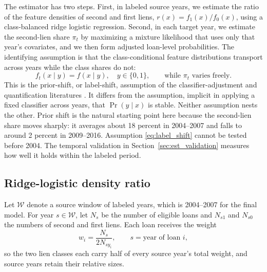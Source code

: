 \documentclass[letterpaper,12pt,usenames,dvipsnames]{article}
\theoremstyle{definition}
\begin{document}
The estimator has two steps. First, in labeled source years, we estimate the ratio of the
feature densities of second and first liens, $r(x) = f_1(x)/f_0(x)$, using a class-balanced
ridge logistic regression. Second, in each target year, we estimate the second-lien share
$\pi_t$ by maximizing a mixture likelihood that uses only that year's covariates, and we then
form adjusted loan-level probabilities. The identifying assumption is that the class-conditional
feature distributions transport across years while the class shares do not:
\begin{equation}
	f_t(x \mid y) = f(x \mid y), \quad y \in \{0, 1\},
	\qquad \text{while } \pi_t \text{ varies freely.}
	\label{eq:label_shift}
\end{equation}
This is the prior-shift, or label-shift, assumption of the classifier-adjustment and
quantification literatures \citep{saerens2002adjusting,gonzalez2017review,lipton2018detecting}.
It differs from the assumption, implicit in applying a fixed classifier across years, that
$\Pr(y \mid x)$ is stable. Neither assumption nests the other. Prior shift is the natural
starting point here because the second-lien share moves sharply: it averages about 18 percent
in 2004--2007 and falls to around 2 percent in 2009--2016. Assumption \eqref{eq:label_shift} cannot be
tested before 2004. The temporal validation in Section~\ref{sec:est_validation} measures how well
it holds within the labeled period.

\subsection{Ridge-logistic density ratio}\label{sec:est_logistic}

Let $\mathcal{W}$ denote a source window of labeled years, which is 2004--2007 for the final
model. For year $s \in \mathcal{W}$, let $N_s$ be the number of eligible loans and $N_{s1}$ and
$N_{s0}$ the numbers of second and first liens. Each loan receives the weight
\begin{equation}
	w_i = \frac{N_{s}}{2 N_{s y_i}}, \qquad s = \text{year of loan } i ,
	\label{eq:weights}
\end{equation}
so the two lien classes each carry half of every source year's total weight, and source years
retain their relative sizes.
\end{document}
